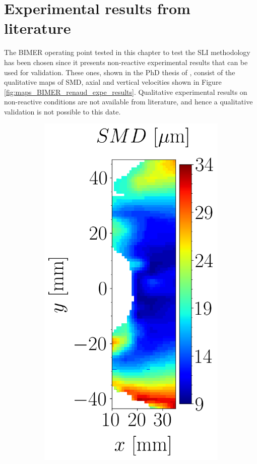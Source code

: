 \section{Experimental results from literature}

The BIMER operating point tested in this chapter to test the SLI methodology has been chosen since it presents non-reactive experimental results that can be used for validation. These ones, shown in the PhD thesis of , consist of the qualitative maps of SMD, axial and vertical velocities shown in Figure \ref{fig:maps_BIMER_renaud_expe_results}. Qualitative experimental results on non-reactive conditions are not available from literature, and hence a qualitative validation is not possible to this date.

\begin{figure}[h!]
\flushleft
\begin{subfigure}[b]{0.3\textwidth}
	\centering
   \includegraphics[scale=0.4]{./part3_applications/figures_ch9_lagrangian/expe_maps/SMD_map.png}

\end{subfigure}
\end{figure}
